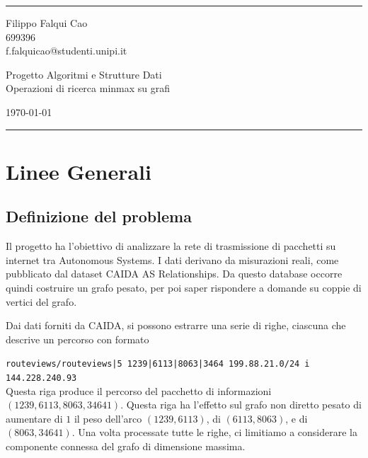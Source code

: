 \documentclass[a4paper]{article}
\begin{document}

\fancyhead[C]{}
\hrule \medskip %
\begin{minipage}{0.295\textwidth} 
\raggedright
\footnotesize
Filippo Falqui Cao \hfill\\   
699396 \hfill\\
f.falquicao@studenti.unipi.it
\end{minipage}
\begin{minipage}{0.4\textwidth} 
\centering 
\large 
Progetto Algoritmi e Strutture Dati\\ 
\normalsize 
Operazioni di ricerca minmax su grafi\\ 
\end{minipage}
\begin{minipage}{0.295\textwidth} 
\raggedleft
\today\hfill\\
\end{minipage}
\medskip\hrule 
\bigskip


\tableofcontents

\bigskip\bigskip

\section{Linee Generali}
\subsection{Definizione del problema}
Il progetto ha l'obiettivo di analizzare la rete di trasmissione di pacchetti su internet tra Autonomous Systems. I dati derivano da misurazioni reali, come pubblicato dal dataset CAIDA AS Relationships. Da questo database occorre quindi costruire un grafo pesato, per poi saper rispondere a domande su coppie di vertici del grafo. 

Dai dati forniti da CAIDA, si possono estrarre una serie di righe, ciascuna che descrive un percorso con formato 

\medskip
{
\centering 
\texttt{routeviews/routeviews|5 1239|6113|8063|3464 199.88.21.0/24 i 144.228.240.93}\\
}
\medskip
Questa riga produce il percorso del pacchetto di informazioni $(1239,6113,8063,34641)$. Questa riga ha l'effetto sul grafo non diretto pesato di aumentare di $1$ il peso dell'arco $(1239,6113)$, di $(6113, 8063)$, e di $(8063, 34641)$. Una volta processate tutte le righe, ci limitiamo a considerare la componente connessa del grafo di dimensione massima. 
\end{document}
